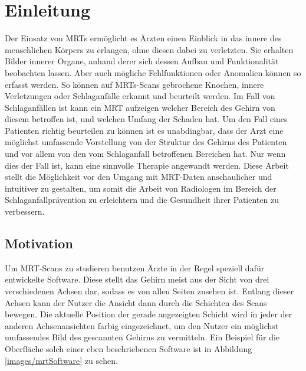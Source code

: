 %
\begin{figure}
	\centering
	\caption{}
	\label{img:teaser}
\end{figure}

\chapter{Einleitung}

Der Einsatz von MRTs ermöglicht es Ärzten einen Einblick in das innere des menschlichen Körpers zu erlangen, ohne diesen dabei zu verletzten. Sie erhalten Bilder innerer Organe, anhand derer sich dessen Aufbau und Funktionalität beobachten lassen. Aber auch mögliche Fehlfunktionen oder Anomalien können so erfasst werden. So können auf MRTs-Scans gebrochene Knochen, innere Verletzungen oder Schlaganfälle erkannt und beurteilt werden. Im Fall von Schlaganfällen ist kann ein MRT aufzeigen welcher Bereich des Gehirn von diesem betroffen ist, und welchen Umfang der Schaden hat.
Um den Fall eines Patienten richtig beurteilen zu können ist es unabdingbar, dass der Arzt eine möglichst umfassende Vorstellung von der Struktur des Gehirns des Patienten und vor allem von den vom Schlaganfall betroffenen Bereichen hat. Nur wenn dies der Fall ist, kann eine sinnvolle Therapie angewandt werden.
Diese Arbeit stellt die Möglichkeit vor den Umgang mit MRT-Daten anschaulicher und intuitiver zu gestalten, um somit die Arbeit von Radiologen im Bereich der Schlaganfallprävention zu erleichtern und die Gesundheit ihrer Patienten zu verbessern.

\section{Motivation}
\label{motivation}

Um MRT-Scans zu studieren benutzen Ärzte in der Regel speziell dafür entwickelte Software. Diese stellt das Gehirn meist aus der Sicht von drei verschiedenen Achsen dar, sodass es von allen Seiten zusehen ist. Entlang dieser Achsen kann der Nutzer die Ansicht dann durch die Schichten des Scans bewegen. Die aktuelle Position der gerade angezeigten Schicht wird in jeder der anderen Achsenansichten farbig eingezeichnet, um den Nutzer ein möglichst umfassendes Bild des gescannten Gehirns zu vermitteln. 
Ein Beispiel für die Oberfläche solch einer eben beschriebenen Software ist in Abbildung \ref{images/mrtSoftware} zu sehen. 

